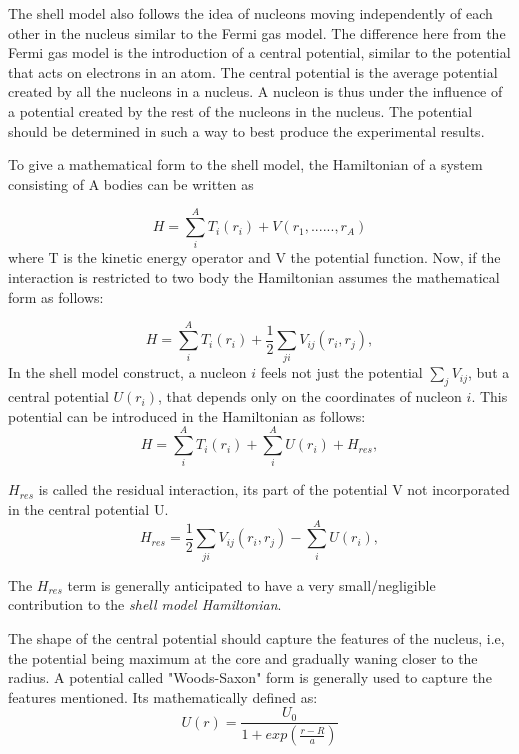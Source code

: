 The shell model also follows the idea of nucleons moving independently of each other in the nucleus similar to the Fermi gas model. The difference here from the Fermi gas model is the introduction of a central potential, similar to the potential that acts on electrons in an atom. The central potential is the average potential created by all the nucleons in a nucleus. A nucleon is thus under the influence of a potential created by the rest of the nucleons in the nucleus. The potential should be determined in such a way to best produce the experimental results.

To give a mathematical form to the shell model, the Hamiltonian of a system consisting of A bodies can be written as

\begin{equation}
H = \sum_{i}^{A} T_{i}(r_{i}) + V(r_{1},......,r_{A})
\end{equation}
where T is the kinetic energy operator and V the potential function.
Now, if the interaction is restricted to two body the Hamiltonian assumes the mathematical form as follows:

\begin{equation}
H = \sum_{i}^{A} T_{i}(r_{i}) + \frac{1}{2}\sum_{ji}^{}V_{ij}(r_{i},r_{j}),
\end{equation}
In the shell model construct, a nucleon $\textit{i}$ feels not just the potential $\sum_{j}^{}V_{ij}$, but a central potential $U(r_{i})$, that depends only on the coordinates of nucleon $\textit{i}$. This potential can be introduced in the Hamiltonian as follows:
\begin{equation}
H = \sum_{i}^{A} T_{i}(r_{i}) + \sum_{i}^{A}U(r_{i}) + H_{res},
\end{equation}

$H_{res}$ is called the residual interaction, its part of the potential V not incorporated in the central potential U.
\begin{equation}
H_{res} = \frac{1}{2}\sum_{ji}^{}V_{ij}(r_{i},r_{j}) - \sum_{i}^{A}U(r_{i}),
\end{equation}

The $H_{res}$ term is generally anticipated to have a very small/negligible contribution to the \textit{shell model Hamiltonian}. 

The shape of the central potential should capture the features of the nucleus, i.e, the potential being maximum at the core and gradually waning closer to the radius. A potential called "Woods-Saxon" form is generally used to capture the features mentioned. Its mathematically defined as:
\begin{equation}
U(r) = \frac{U_{0}}{1+exp(\frac{r-R}{a})} 
\end{equation}

